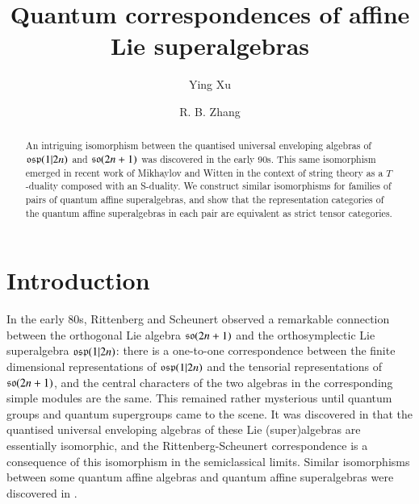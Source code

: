 \documentclass[12pt]{amsart}
\theoremstyle{definition}
\theoremstyle{remark}
\numberwithin{equation}{section}
\begin{document}
\normalfont
\sloppy

\title[Quantum correspondences]{Quantum correspondences of affine Lie superalgebras}
\author{Ying Xu}
\author{R. B. Zhang}
\address[Xu]{School of Mathematics, Hefei University of Technology, Anhui Province, 230009, China}
\address[Xu, Zhang]{School of Mathematics and Statistics,
University of Sydney, NSW 2006, Australia}
\begin{abstract}
An intriguing isomorphism between the quantised universal enveloping algebras of ${{\rm\mathfrak{osp}}}(1|2n)$ and ${{\rm\mathfrak{so}}}(2n+1)$ was discovered in the early 90s.
This same isomorphism emerged in recent work of Mikhaylov and Witten
in the context of string theory as a $T$-duality composed with an S-duality.
We construct similar isomorphisms for families of pairs of quantum affine superalgebras, and show that the representation categories of the quantum affine superalgebras in each pair are equivalent as strict tensor categories.
\end{abstract}
\maketitle

\section{Introduction}\label{sect:introduction}
In the early 80s, Rittenberg and Scheunert  \cite{RS} observed a remarkable connection between the orthogonal Lie algebra ${{\rm\mathfrak{so}}}(2n+1)$ and
the orthosymplectic Lie superalgebra ${{\rm\mathfrak{osp}}}(1|2n)$: there is a one-to-one
correspondence between the finite dimensional  representations of
${{\rm\mathfrak{osp}}}(1|2n)$ and the tensorial representations of ${{\rm\mathfrak{so}}}(2n+1)$,
and the central characters of the two algebras
in the corresponding simple modules are the same.
This remained rather mysterious until
quantum groups \cite{D1, J} and quantum supergroups \cite{BGZ, Y,  ZGB,Z93, Z98}
came to the scene.
It was discovered in \cite{Z3} that the quantised universal enveloping
algebras of these Lie (super)algebras are essentially isomorphic, and the
Rittenberg-Scheunert correspondence is a consequence of this isomorphism
in the semiclassical limits. Similar isomorphisms between some
quantum affine algebras and quantum affine superalgebras were discovered in \cite{Z2}.
\end{document}
